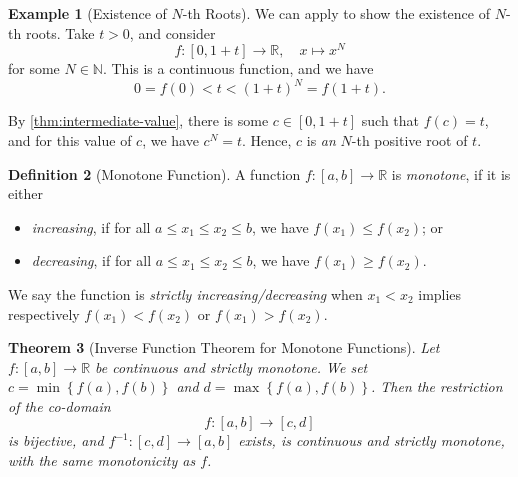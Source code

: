 \documentclass[11pt]{article}
\numberwithin{equation}{section}
\newtheorem{theorem}{Theorem}[section]
\theoremstyle{definition}
\newtheorem{definition}[theorem]{Definition}
\newtheorem{example}[theorem]{Example}
\theoremstyle{remark}
\newcommand{\pqty}[1]{\left(#1\right)}
\newcommand{\Bqty}[1]{\left\{#1\right\}}
\newcommand{\ccintv}[2]{[#1,#2]}
\newcommand{\functiondomain}[3]{#1:#2\to #3}
\newcommand{\function}[5]{#1:#2\to #3,\quad #4\mapsto #5}
\newcommand{\RR}{\mathbb R}
\newcommand{\NN}{\mathbb N}
\newcommand{\inverse}{^{-1}}
\begin{document}
\begin{example}[Existence of \(N\)-th Roots]\label{analysis-unit-0098}
    \label{ex:existence-nth-roots}%
    We can apply to show the existence of \(N\)-th roots. Take \(t > 0\), and consider
    \[
        \function{f}{\ccintv{0}{1 + t}}{\RR}{x}{x^N}
    \]
    for some \(N \in \NN\). This is a continuous function, and we have
    \[
        0 = f\pqty{0} < t < \pqty{1 + t}^N = f\pqty{1 + t}.
    \]

    By \autoref{thm:intermediate-value}, there is some \(c \in \ccintv{0}{1 + t}\) such that \(f\pqty{c} = t\), and for this value of \(c\), we have \(c^N = t\). Hence, \(c\) is \emph{an} \(N\)-th positive root of \(t\).
\end{example}

\begin{definition}[Monotone Function]\label{analysis-unit-0099}
    \label{def:monotone-function}%
    A function \(\functiondomain{f}{\ccintv{a}{b}}{\RR}\) is \emph{monotone}, if it is either
    \begin{itemize}
        \item \emph{increasing}, if for all \(a \leq x_1 \leq x_2 \leq b\), we have \(f\pqty{x_1} \leq f\pqty{x_2}\); or
        \item \emph{decreasing}, if for all \(a \leq x_1 \leq x_2 \leq b\), we have \(f\pqty{x_1} \geq f\pqty{x_2}\).
    \end{itemize}

    We say the function is \emph{strictly increasing/decreasing} when \(x_1<x_2\) implies respectively \(f(x_1)<f(x_2)\) or \(f(x_1)>f(x_2)\).
\end{definition}

\begin{theorem}[Inverse Function Theorem for Monotone Functions]\label{analysis-unit-0100}
    \label{thm:inverse-fn-thm-monotone}
    Let \(\functiondomain{f}{\ccintv{a}{b}}{\RR}\) be continuous and strictly monotone. We set \(c = \min\Bqty{f\pqty{a}, f\pqty{b}}\) and \(d = \max\Bqty{f\pqty{a}, f\pqty{b}}\). Then the restriction of the co-domain
    \[
        \functiondomain{f}{\ccintv{a}{b}}{\ccintv{c}{d}}
    \]
    is bijective, and \(\functiondomain{f\inverse}{\ccintv{c}{d}}{\ccintv{a}{b}}\) exists, is continuous and strictly monotone, with the same monotonicity as \(f\).
\end{theorem}
\end{document}
